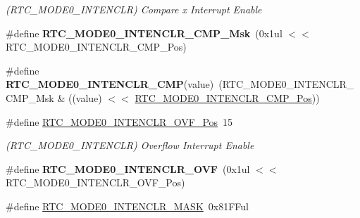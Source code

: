 \begin{DoxyCompactItemize}
\begin{DoxyCompactList}\small\item\em (R\+T\+C\+\_\+\+M\+O\+D\+E0\+\_\+\+I\+N\+T\+E\+N\+C\+L\+R) Compare x Interrupt Enable \end{DoxyCompactList}\item 
\hypertarget{group___s_a_m_l21___r_t_c_ga311cdc6a750dbc0df2be035d2e67b449}{}\#define {\bfseries R\+T\+C\+\_\+\+M\+O\+D\+E0\+\_\+\+I\+N\+T\+E\+N\+C\+L\+R\+\_\+\+C\+M\+P\+\_\+\+Msk}~(0x1ul $<$$<$ R\+T\+C\+\_\+\+M\+O\+D\+E0\+\_\+\+I\+N\+T\+E\+N\+C\+L\+R\+\_\+\+C\+M\+P\+\_\+\+Pos)\label{group___s_a_m_l21___r_t_c_ga311cdc6a750dbc0df2be035d2e67b449}

\item 
\hypertarget{group___s_a_m_l21___r_t_c_gad721c842be55bfb3d0f08a6dc1ce8dbc}{}\#define {\bfseries R\+T\+C\+\_\+\+M\+O\+D\+E0\+\_\+\+I\+N\+T\+E\+N\+C\+L\+R\+\_\+\+C\+M\+P}(value)~(R\+T\+C\+\_\+\+M\+O\+D\+E0\+\_\+\+I\+N\+T\+E\+N\+C\+L\+R\+\_\+\+C\+M\+P\+\_\+\+Msk \& ((value) $<$$<$ \hyperlink{group___s_a_m_l21___r_t_c_gafdb78dfafb520b259ef9365687c6b010}{R\+T\+C\+\_\+\+M\+O\+D\+E0\+\_\+\+I\+N\+T\+E\+N\+C\+L\+R\+\_\+\+C\+M\+P\+\_\+\+Pos}))\label{group___s_a_m_l21___r_t_c_gad721c842be55bfb3d0f08a6dc1ce8dbc}

\item 
\hypertarget{group___s_a_m_l21___r_t_c_ga9a71f0bf63216cac0925e9be8feab832}{}\#define \hyperlink{group___s_a_m_l21___r_t_c_ga9a71f0bf63216cac0925e9be8feab832}{R\+T\+C\+\_\+\+M\+O\+D\+E0\+\_\+\+I\+N\+T\+E\+N\+C\+L\+R\+\_\+\+O\+V\+F\+\_\+\+Pos}~15\label{group___s_a_m_l21___r_t_c_ga9a71f0bf63216cac0925e9be8feab832}

\begin{DoxyCompactList}\small\item\em (R\+T\+C\+\_\+\+M\+O\+D\+E0\+\_\+\+I\+N\+T\+E\+N\+C\+L\+R) Overflow Interrupt Enable \end{DoxyCompactList}\item 
\hypertarget{group___s_a_m_l21___r_t_c_gada2ce98567dd0b9b1b7ea3309c854335}{}\#define {\bfseries R\+T\+C\+\_\+\+M\+O\+D\+E0\+\_\+\+I\+N\+T\+E\+N\+C\+L\+R\+\_\+\+O\+V\+F}~(0x1ul $<$$<$ R\+T\+C\+\_\+\+M\+O\+D\+E0\+\_\+\+I\+N\+T\+E\+N\+C\+L\+R\+\_\+\+O\+V\+F\+\_\+\+Pos)\label{group___s_a_m_l21___r_t_c_gada2ce98567dd0b9b1b7ea3309c854335}

\item 
\hypertarget{group___s_a_m_l21___r_t_c_gaca8e7ad740734f363069747089473034}{}\#define \hyperlink{group___s_a_m_l21___r_t_c_gaca8e7ad740734f363069747089473034}{R\+T\+C\+\_\+\+M\+O\+D\+E0\+\_\+\+I\+N\+T\+E\+N\+C\+L\+R\+\_\+\+M\+A\+S\+K}~0x81\+F\+Ful\label{group___s_a_m_l21___r_t_c_gaca8e7ad740734f363069747089473034}


\end{DoxyCompactItemize}
